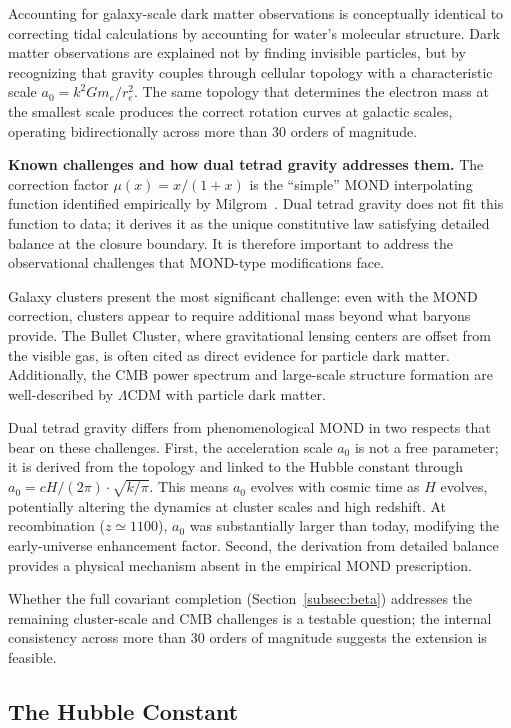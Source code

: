 \documentclass[aps,prd,preprint,superscriptaddress,showpacs,preprintnumbers,amsmath,amssymb,nofootinbib]{revtex4-2}
\begin{document}
Accounting for galaxy-scale dark matter observations is conceptually identical to correcting tidal calculations by accounting for water's molecular structure. Dark matter observations are explained not by finding invisible particles, but by recognizing that gravity couples through cellular topology with a characteristic scale $a_0 = k^2 G m_e / r_e^2$. The same topology that determines the electron mass at the smallest scale produces the correct rotation curves at galactic scales, operating bidirectionally across more than 30 orders of magnitude.

\textbf{Known challenges and how dual tetrad gravity addresses them.} The correction factor $\mu(x) = x/(1+x)$ is the ``simple'' MOND interpolating function identified empirically by Milgrom~\cite{milgrom1983}. Dual tetrad gravity does not fit this function to data; it derives it as the unique constitutive law satisfying detailed balance at the closure boundary. It is therefore important to address the observational challenges that MOND-type modifications face.

Galaxy clusters present the most significant challenge: even with the MOND correction, clusters appear to require additional mass beyond what baryons provide. The Bullet Cluster, where gravitational lensing centers are offset from the visible gas, is often cited as direct evidence for particle dark matter. Additionally, the CMB power spectrum and large-scale structure formation are well-described by $\Lambda$CDM with particle dark matter.

Dual tetrad gravity differs from phenomenological MOND in two respects that bear on these challenges. First, the acceleration scale $a_0$ is not a free parameter; it is derived from the topology and linked to the Hubble constant through $a_0 = cH/(2\pi) \cdot \sqrt{k/\pi}$. This means $a_0$ evolves with cosmic time as $H$ evolves, potentially altering the dynamics at cluster scales and high redshift. At recombination ($z \simeq 1100$), $a_0$ was substantially larger than today, modifying the early-universe enhancement factor. Second, the derivation from detailed balance provides a physical mechanism absent in the empirical MOND prescription.

Whether the full covariant completion (Section~\ref{subsec:beta}) addresses the remaining cluster-scale and CMB challenges is a testable question; the internal consistency across more than 30 orders of magnitude suggests the extension is feasible.

\subsection{The Hubble Constant}
\label{subsec:hubble}
\end{document}
